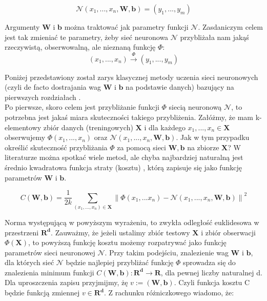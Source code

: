 \documentclass[licencjacka]{pracamgr}
\newcommand{\norm}[1]{\left\lVert#1\right\rVert}
\begin{document}
$$\mathcal{N}(x_{1},...,x_{n}, \mathbf{W}, \mathbf{b}) = (y_{1},...,y_{m})$$

Argumenty $\mathbf{W}$  i $\mathbf{b}$ można traktować jak parametry funkcji $\mathbf{\mathcal{N}}$. Zasdaniczym celem jest tak zmieniać te parametry, żeby sieć neuronowa $\mathbf{\mathcal{N}}$ przybliżała nam jakąś rzeczywistą, obserwowalną, ale nieznaną funkcję $\Phi$: 
$$ (x_{1},...,x_{n})\stackrel{\Phi}{\rightarrow}(y_{1},...,y_{m})$$

Poniżej przedstawiony został zarys klasycznej metody uczenia sieci neuronowych (czyli de facto dostrajania wag   $\mathbf{W}$  i $\mathbf{b}$ na podstawie danych) bazujący na pierwszych rozdziałach \cite{nn}.\\

 
Po pierwsze, skoro celem jest przybliżanie funkcji $\Phi$ siecią neuronową $\mathbf{\mathcal{N}}$, to potrzebna jest jakaś miara skuteczności takiego przybliżenia.  Załóżmy, że mam k-elementowy zbiór danych (treningowych) $\mathbf{X}$ i dla każdego $x_{1},...,x_{n}\in\mathbf{X}$ obserwujemy $\Phi(x_{1},...,x_{n})$ oraz $\mathbf{\mathcal{N}}(x_{1},...,x_{n}, \mathbf{W}, \mathbf{b})$. Jak w tym przypadku określić skuteczność przybliżania $\Phi$ za pomocą sieci $\mathbf{W}, \mathbf{b}$ na zbiorze $\mathbf{X}$? W literaturze można spotkać wiele metod, ale chyba najbardziej naturalną jest średnio kwadratowa funkcja straty (kosztu) , którą zapisuje się jako funkcję parametrów $\mathbf{W}$ i $\mathbf{b}$.
 
\begin{equation}
	\label{Cost_function}
	C(\mathbf{W}, \mathbf{b}) = \frac{1}{2k}\sum_{(x_{1},...,x_{n})\in\mathbf{X}}{\norm{\Phi(x_{1},...x_{n}) - \mathbf{\mathcal{N}}(x_{1},...,x_{n}, \mathbf{W}, \mathbf{b} )} } ^{2}
\end{equation}
 
 
Norma występującą w powyższym wyrażeniu, to zwykła odległość euklidesowa w przestrzeni $\mathbf{R^{d}}$. Zauważmy, że jeżeli ustalimy zbiór testowy $\mathbf{X}$ i zbiór obserwacji $\Phi(\mathbf{X})$, to powyższą funkcję kosztu możemy rozpatrywać jako funkcję parametrów sieci neuronowej $\mathbf{\mathcal{N}}$. Przy takim podejściu, znalezienie wag $\mathbf{W}$ i $\mathbf{b}$, dla których sieć $\mathbf{\mathcal{N}}$ będzie najlepiej przybliżać funkcję $\Phi$ sprowadza się do znalezienia minimum funkcji $C(\mathbf{W}, \mathbf{b}):\mathbf{R^{d}}\rightarrow\mathbf{R}$, dla pewnej liczby naturalnej d.  Dla uproszczenia zapisu przyjmijmy, żę $v:=(\mathbf{W}, \mathbf{b})$. Czyli funkcja kosztu C będzie funkcją zmiennej $v\in\mathbf{R^{d}}$. Z rachunku różniczkowego wiadomo, że:
 
\end{document}
